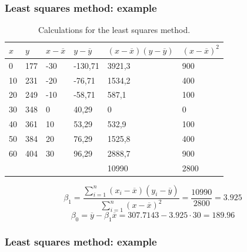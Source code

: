 \documentclass{beamer}
\begin{document}
\begin{frame}
  \frametitle{Least squares method: example}
  \begin{table}[h] \centering
    \begin{tabular}{@{}llllll@{}}
    	\toprule
    	$x$ & $y$ & $x-\overline{x}$ & $y - \overline{y}$ & $(x-\overline{x})(y - \overline{y})$ & $(x-\overline{x})^{2}$ \\ \midrule
    	0   & 177 & -30              & -130,71            & 3921,3                               & 900                    \\
    	10  & 231 & -20              & -76,71             & 1534,2                               & 400                    \\
    	20  & 249 & -10              & -58,71             & 587,1                                & 100                    \\
    	30  & 348 & 0                & 40,29              & 0                                    & 0                      \\
    	40  & 361 & 10               & 53,29              & 532,9                                & 100                    \\
    	50  & 384 & 20               & 76,29              & 1525,8                               & 400                    \\
    	60  & 404 & 30               & 96,29              & 2888,7                               & 900                    \\
    	    &     &                  &                    & 10990                                & 2800                   \\ \bottomrule
    \end{tabular}
    \caption{Calculations for the least squares method.}
    \label{tab:rendieren2}
  \end{table}
  \[ \beta_{1} = \frac{\sum_{i=1}^{n} (x_{i}-\overline{x})(y_{i} - \overline{y})}{\sum_{i=1}^{n} (x-\overline{x})^{2}} = \frac{10990}{2800} = 3.925 \]
  \[ \beta_{0} = \overline{y} - \beta_{1} \overline{x} = 307.7143 - 3.925 \cdot 30 = 189.96 \]
\end{frame}

\begin{frame}
  \frametitle{Least squares method: example}
  \centering
\end{frame}
\end{document}
